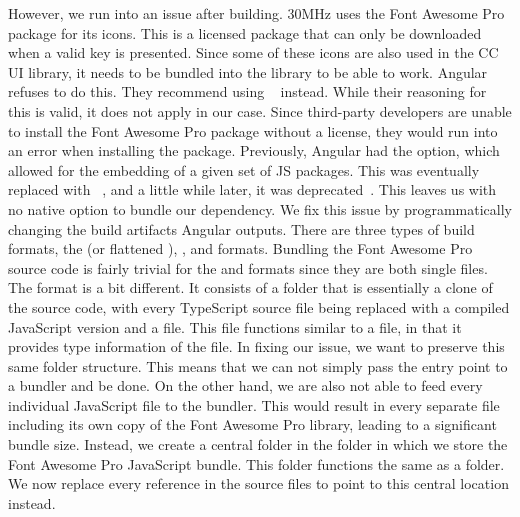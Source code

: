 {  However, we run into an issue after building. 30MHz uses the Font Awesome Pro~ package for its icons. This is a licensed package that can only be downloaded when a valid key is presented. Since some of these icons are also used in the CC UI library, it needs to be bundled into the library to be able to work. Angular refuses to do this. They recommend using ~ instead. While their reasoning for this is valid, it does not apply in our case. Since third-party developers are unable to install the Font Awesome Pro package without a license, they would run into an error when installing the package. Previously, Angular had the  option, which allowed for the embedding of a given set of JS packages. This was eventually replaced with ~, and a little while later, it was deprecated~. This leaves us with no native option to bundle our dependency.
}{
  We fix this issue by programmatically changing the build artifacts Angular outputs. There are three types of build formats, the  (or flattened ), , and  formats. Bundling the Font Awesome Pro source code is fairly trivial for the  and  formats since they are both single files. The  format is a bit different. It consists of a folder that is essentially a clone of the source code, with every TypeScript source file being replaced with a compiled JavaScript version and a  file. This  file functions similar to a  file, in that it provides type information of the file. In fixing our issue, we want to preserve this same folder structure. This means that we can not simply pass the entry point to a bundler and be done. On the other hand, we are also not able to feed every individual JavaScript file to the bundler. This would result in every separate file including its own copy of the Font Awesome Pro library, leading to a significant bundle size. Instead, we create a central folder in the  folder in which we store the Font Awesome Pro JavaScript bundle. This folder functions the same as a  folder. We now replace every reference in the source files to point to this central location instead.
}

